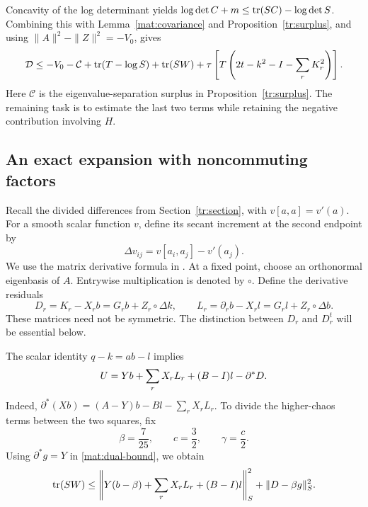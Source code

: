 Concavity of the log determinant yields
$\log\det C+m\le\operatorname{tr}(SC)-\log\det S$.  Combining this with
Lemma~\ref{mat:covariance} and Proposition~\ref{tr:surplus}, and using
$\|A\|^2-\|Z\|^2=-V_0$, gives
\begin{equation}\label{mat:deficit-reduction}
 \mathcal{D}\le -V_0-\mathcal C+\operatorname{tr}(T-\log S)+\operatorname{tr}(SW)
   +\tau\left[T\left(2t-k^2-I-\sum_rK_r^2\right)\right].
\end{equation}
Here $\mathcal C$ is the eigenvalue-separation surplus in
Proposition~\ref{tr:surplus}.  The remaining task is to estimate the last
two terms while retaining the negative contribution involving $H$.

\subsection{An exact expansion with noncommuting factors}

Recall the divided differences from Section~\ref{tr:section}, with
$v[a,a]=v'(a)$.  For a smooth scalar function $v$, define its secant
increment at the second endpoint by
\[
 \Delta v_{ij}=v[a_i,a_j]-v'(a_j).
\]
We use the matrix derivative formula in
\cite[Section~2.4]{Noferini2017}.
At a fixed point, choose an orthonormal eigenbasis of $A$.  Entrywise
multiplication is denoted by $\circ$.  Define the derivative residuals
\begin{equation}\label{mat:residuals}
 D_r=K_r-X_rb=G_rb+Z_r\circ\Delta k,\qquad
 L_r=\partial_rb-X_rl=G_rl+Z_r\circ\Delta b.
\end{equation}
These matrices need not be symmetric.  The distinction between $D_r$
and $D_r^t$ will be essential below.

The scalar identity $q-k=ab-l$ implies
\begin{equation}\label{mat:U-representation}
 U=Yb+\sum_rX_rL_r+(B-I)l-\partial^*D.
\end{equation}
Indeed,
$\partial^*(Xb)=(A-Y)b-Bl-\sum_rX_rL_r$.
To divide the higher-chaos terms between the two squares, fix
\begin{equation}\label{mat:constants}
 \beta=\frac7{25},\qquad c=\frac32,\qquad \gamma=\frac c2.
\end{equation}
Using $\partial^*g=Y$ in \eqref{mat:dual-bound}, we obtain
\begin{equation}\label{mat:W-bound}
 \operatorname{tr}(SW)\le
 \left\|Y(b-\beta)+\sum_rX_rL_r+(B-I)l\right\|_S^2
 +\|D-\beta g\|_S^2.
\end{equation}


